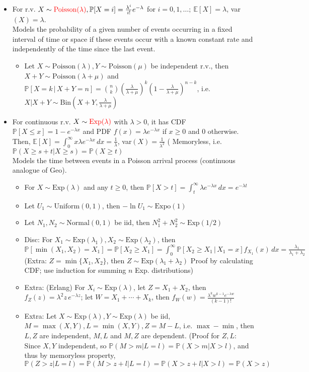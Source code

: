 \documentclass{article}
\begin{document}
\begin{itemize}
	\item For r.v. $X\sim {\color{red} \text{Poisson}(\lambda)}, \mathbb{P}[X=i] = \frac{\lambda^i}{i!} e^{-\lambda}$ for $i = 0,1,\dots;\ \mathbb{E}[X] = \lambda$, var$(X) = \lambda$. \\
	Models the probability of a given number of events occurring in a fixed interval of time or space if these events occur with a known constant rate and independently of the time since the last event.
	\begin{itemize}
		\item Let $X\sim\text{Poisson}(\lambda), Y\sim\text{Poisson}(\mu)$ be independent r.v., then $X+Y\sim\text{Poisson}(\lambda+\mu)$ and
		$\mathbb{P}[X=k\,|\,X+Y=n] = \binom{n}{k} (\frac{\lambda}{\lambda+\mu})^k (1 - \frac{\lambda}{\lambda+\mu})^{n-k}$, i.e. $X|X+Y \sim \text{Bin}(X+Y, \frac{\lambda}{\lambda + \mu})$
	\end{itemize}

	\item For continuous r.v. $X\sim {\color{red}\text{Exp}(\lambda)}$ with $\lambda > 0$, it has CDF $\mathbb{P}[X\leq x] = 1 - e^{-\lambda x}$ and PDF $f(x) = \lambda e^{-\lambda x}$ if $x\geq0$ and 0 otherwise.
	Then, $\mathbb{E}[X] = \int_{0}^{\infty} x\lambda e^{-\lambda x}\,dx = \frac{1}{\lambda}$, var$(X) = \frac{1}{\lambda^2}$ ({\color{red} Memoryless}, i.e. $\mathbb{P}(X\geq s+t | X\geq s) = \mathbb{P}(X\geq t)$ \\
	Models the time between events in a Poisson arrival process (continuous analogue of Geo).
	\begin{itemize}
		\item For $X\sim\text{Exp}(\lambda)$ and any $t\geq0$, then $\mathbb{P}[X>t] = \int_t^\infty \lambda e^{-\lambda x} \, dx = e^{-\lambda t}$
		\item Let $U_1\sim\text{Uniform}(0,1)$, then $-\ln U_1\sim\text{Expo}(1)$
		\item Let $N_1, N_2\sim\text{Normal}(0,1)$ be iid, then $N_1^2+N_2^2\sim\text{Exp}(1/2)$
		\item Disc: For $X_1\sim\text{Exp}(\lambda_1), X_2\sim\text{Exp}(\lambda_2)$, then
		$\mathbb{P}[\min(X_1,X_2) = X_1] = \mathbb{P}[X_2\geq X_1] = \int_0^\infty \mathbb{P}[X_2\geq X_1\,|\,X_1 = x] f_{X_1}(x)\, dx= \frac{\lambda_1}{\lambda_1 + \lambda_2}$ \\
		(Extra: $Z = \min\{X_1,X_2\}$, then $Z\sim\text{Exp}(\lambda_1+\lambda_2)$ Proof by calculating CDF; use induction for summing $n$ Exp. distributions)
		\item Extra: (Erlang) For $X_i\sim\text{Exp}(\lambda)$, let $Z = X_1 + X_2$, then $f_Z(z) = \lambda^2z\,e^{-\lambda z}$; let $W = X_1+\cdots+X_k$, then $f_W(w) = \frac{\lambda^kw^{k-1}e^{-\lambda w}}{(k-1)!}$
		\item Extra: Let $X\sim\text{Exp}(\lambda), Y\sim\text{Exp}(\lambda)$ be iid, $M = \max(X,Y), L = \min(X,Y), Z = M-L$, i.e. $\max-\min$, then $L,Z$ are independent, $M,L$ and $M,Z$ are dependent.
		(Proof for $Z,L$: Since $X,Y$ independent, so $\mathbb{P}(M>m|L=l) = \mathbb{P}(X>m|X>l)$, and thus by memoryless property,
		$\mathbb{P}(Z>z|L=l) = \mathbb{P}(M>z+l|L=l) = \mathbb{P}(X>z+l|X>l) = \mathbb{P}(X>z)$
	\end{itemize}


\end{itemize}
\end{document}
